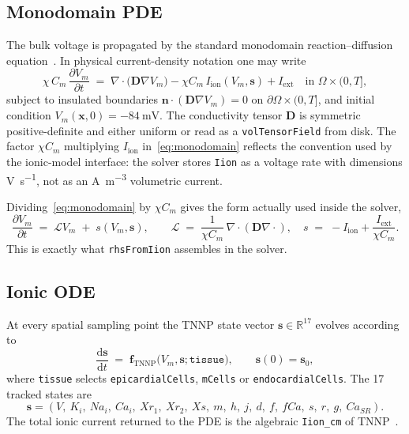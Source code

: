 \documentclass[11pt,a4paper]{article}
\newcommand{\Vm}{V_{m}}
\newcommand{\Iion}{I_{\text{ion}}}
\newcommand{\Iext}{I_{\text{ext}}}
\newcommand{\Dten}{\mathbf{D}}
\newcommand{\grad}{\nabla}
\newcommand{\divg}{\nabla\!\cdot}
\newcommand{\code}[1]{\texttt{\small #1}}
\begin{document}
\subsection{Monodomain PDE}

The bulk voltage is propagated by the standard monodomain
reaction--diffusion equation~\cite{ttp2004,niederer2012}. In physical
current-density notation one may write
\begin{equation}
  \chi \, C_{m} \, \frac{\partial \Vm}{\partial t}
   \;=\;
   \divg\!\bigl( \Dten \grad \Vm \bigr)
   - \chi C_m\,\Iion(\Vm, \mathbf{s})
   + \Iext
   \quad \text{in } \Omega \times (0, T],
   \label{eq:monodomain}
\end{equation}
subject to insulated boundaries
$\mathbf{n} \cdot ( \Dten \grad \Vm ) = 0$ on
$\partial \Omega \times (0, T]$, and initial condition
$\Vm(\mathbf{x}, 0) = -\SI{84}{\milli\volt}$. The conductivity tensor
$\Dten$ is symmetric positive-definite and either uniform or read as a
\code{volTensorField} from disk. The factor $\chi C_m$ multiplying
$\Iion$ in~\eqref{eq:monodomain} reflects the convention used by the
ionic-model interface: the solver stores \code{Iion} as a voltage rate
with dimensions \si{\volt\per\second}, not as an
\si{\ampere\per\meter\cubed} volumetric current.

Dividing~\eqref{eq:monodomain} by $\chi C_{m}$ gives the form actually
used inside the solver,
\begin{equation}
  \frac{\partial \Vm}{\partial t}
   \;=\;
   \mathcal{L} \Vm
   \;+\;
   s(\Vm, \mathbf{s}),
   \qquad
   \mathcal{L} \;=\; \frac{1}{\chi C_{m}}\,\divg(\Dten \grad \cdot),
   \quad
   s \;=\; -\Iion + \frac{\Iext}{\chi C_{m}}.
   \label{eq:semi-discrete}
\end{equation}
This is exactly what \code{rhsFromIion} assembles in the solver.

\subsection{Ionic ODE}

At every spatial sampling point the TNNP state vector
$\mathbf{s} \in \mathbb{R}^{17}$ evolves according to
\begin{equation}
  \frac{\mathrm{d}\mathbf{s}}{\mathrm{d}t}
   \;=\;
   \mathbf{f}_{\text{TNNP}}\!\bigl(\Vm, \mathbf{s}; \texttt{tissue}\bigr),
   \qquad \mathbf{s}(0) = \mathbf{s}_{0},
   \label{eq:tnnp}
\end{equation}
where \code{tissue} selects \code{epicardialCells}, \code{mCells} or
\code{endocardialCells}. The 17 tracked states are
\[
  \mathbf{s} = (V,\ K_{i},\ Na_{i},\ Ca_{i},\ Xr_{1},\ Xr_{2},\ Xs,\ m,\ h,\ j,\ d,\ f,\ fCa,\ s,\ r,\ g,\ Ca_{SR}).
\]
The total ionic current returned to the PDE is the algebraic
\code{Iion\_cm} of TNNP~\cite{ttp2004}.
\end{document}
